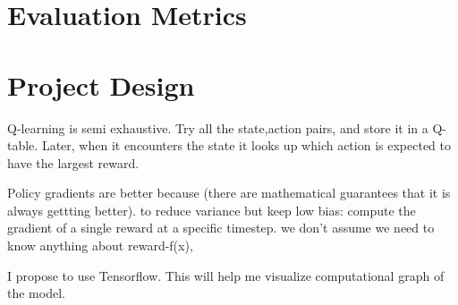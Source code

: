 \documentclass[12pt,a4paper]{article}
\begin{document}
\section*{Evaluation Metrics}
%
%
%
%
\section*{Project Design}
%



Q-learning is semi exhaustive. Try all the state,action pairs, and store it in a Q-table. Later, when it encounters the state it looks up which action is expected to have the largest reward. 

Policy gradients are better because (there are mathematical guarantees that it is always gettting better). to reduce variance but keep low bias:
compute the gradient of a single reward at a specific timestep. we don't assume we need to know anything about reward-f(x),


I propose to use Tensorflow. This will help me visualize computational graph of the model.

%
%
\end{document}
